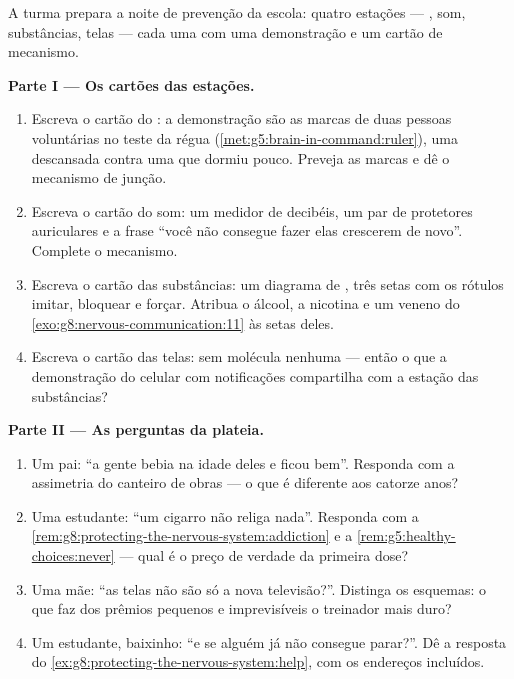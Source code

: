 \begin{problem}\label{pb:g8:protecting-the-nervous-system:1}
A turma prepara a noite de prevenção da escola: quatro estações ---
, som, substâncias, telas --- cada uma com uma demonstração e um
cartão de mecanismo.

\medskip\noindent\textbf{Parte I --- Os cartões das
estações.}
\begin{enumerate}
  \item Escreva o cartão do : a demonstração são as marcas de
        duas pessoas voluntárias no teste da régua
        (\cref{met:g5:brain-in-command:ruler}), uma descansada contra
        uma que dormiu pouco. Preveja as marcas e dê o mecanismo de
        junção.
  \item Escreva o cartão do som: um medidor de decibéis, um par de
        protetores auriculares e a frase ``você não consegue fazer
        elas crescerem de novo''. Complete o mecanismo.
  \item Escreva o cartão das substâncias: um diagrama de ,
        três setas com os rótulos imitar, bloquear e forçar. Atribua
        o álcool, a nicotina e um veneno do
        \cref{exo:g8:nervous-communication:11} às setas deles.
  \item Escreva o cartão das telas: sem molécula nenhuma --- então o
        que a demonstração do celular com notificações compartilha
        com a estação das substâncias?
\end{enumerate}

\medskip\noindent\textbf{Parte II --- As perguntas da
plateia.}
\begin{enumerate}[resume]
  \item Um pai: ``a gente bebia na idade deles e ficou bem''.
        Responda com a assimetria do canteiro de obras --- o que é
        diferente aos catorze anos?
  \item Uma estudante: ``um cigarro não religa nada''. Responda com a
        \cref{rem:g8:protecting-the-nervous-system:addiction} e a
        \cref{rem:g5:healthy-choices:never} --- qual é o preço de
        verdade da primeira dose?
  \item Uma mãe: ``as telas não são só a nova televisão?''. Distinga
        os esquemas: o que faz dos prêmios pequenos e imprevisíveis o
        treinador mais duro?
  \item Um estudante, baixinho: ``e se alguém já não consegue
        parar?''. Dê a resposta do
        \cref{ex:g8:protecting-the-nervous-system:help}, com os
        endereços incluídos.
\end{enumerate}


\end{problem}
